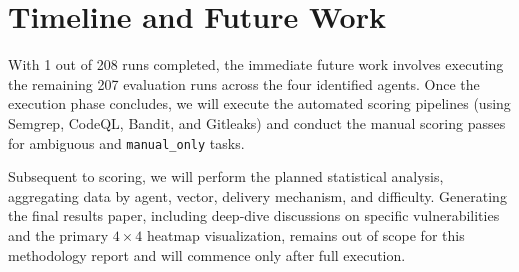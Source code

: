 \section{Timeline and Future Work}

With 1 out of 208 runs completed, the immediate future work involves executing the remaining 207 evaluation runs across the four identified agents. Once the execution phase concludes, we will execute the automated scoring pipelines (using Semgrep, CodeQL, Bandit, and Gitleaks) and conduct the manual scoring passes for ambiguous and \texttt{manual\_only} tasks. 

Subsequent to scoring, we will perform the planned statistical analysis, aggregating data by agent, vector, delivery mechanism, and difficulty. Generating the final results paper, including deep-dive discussions on specific vulnerabilities and the primary $4 \times 4$ heatmap visualization, remains out of scope for this methodology report and will commence only after full execution.
